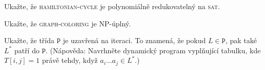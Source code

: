 \documentclass[a4paper,12pt]{amsart}
\begin{document}
\begin{problem}

    Ukažte, že \textsc{hamiltonian-cycle} je polynomiálně  redukovatelný na \textsc{sat}.        

\end{problem}


\begin{problem}

    Ukažte, že \textsc{graph-coloring} je NP-úplný.  

    \smallskip  
    \begin{center}  
    \end{center}  

\end{problem}


\begin{problem}

    Ukažte, že třída $\mathtt{P}$ je uzavřená na iteraci. To znamená, že pokud $L\in\mathtt{P}$, pak také $L^*$ patří do $\mathtt{P}$. (Nápověda: Navrhněte dynamický program vyplňující tabulku, kde $T[i,j]=1$ právě tehdy, když $a_i\dots a_j\in L^*$.)

\end{problem}
\end{document}

